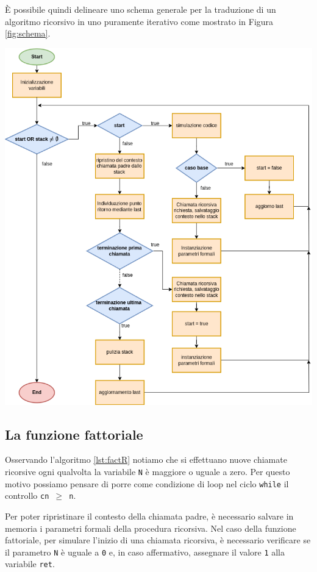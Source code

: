 È possibile quindi delineare uno schema generale per la traduzione di un algoritmo ricorsivo in uno puramente iterativo come mostrato in Figura \ref{fig:schema}.

\begin{center}
	\includegraphics[scale=.6]{res/schema_traduzione}
	\label{fig:schema}
\end{center}


\subsection{La funzione fattoriale}
Osservando l'algoritmo \ref{lst:factR} notiamo che si effettuano nuove chiamate ricorsive ogni qualvolta la variabile \texttt{N} è maggiore o uguale a zero. Per questo motivo possiamo pensare di porre come condizione di loop nel ciclo \texttt{while} il controllo \texttt{cn $\geq$ n}.

Per poter ripristinare il contesto della chiamata padre, è necessario salvare in memoria i parametri formali della procedura ricorsiva. Nel caso della funzione fattoriale, per simulare l'inizio di una chiamata ricorsiva, è necessario verificare se il parametro \texttt{N} è uguale a \texttt{0} e, in caso affermativo, assegnare il valore \texttt{1} alla variabile \texttt{ret}.

